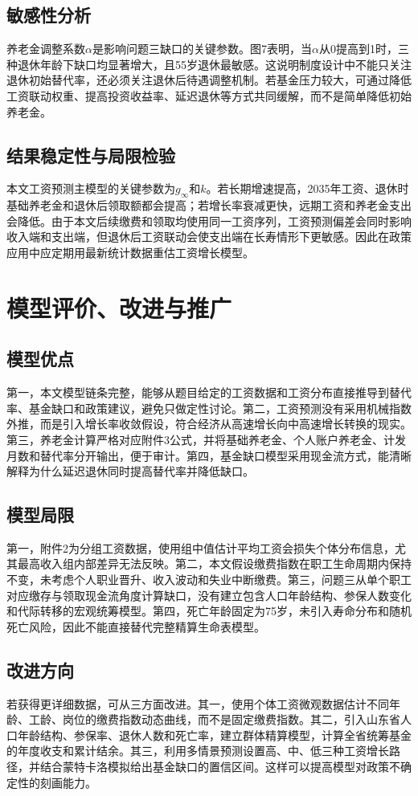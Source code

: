 \documentclass[UTF8,12pt,a4paper]{ctexart}
\begin{document}
\subsection{敏感性分析}
养老金调整系数$\alpha$是影响问题三缺口的关键参数。图7表明，当$\alpha$从0提高到1时，三种退休年龄下缺口均显著增大，且55岁退休最敏感。这说明制度设计中不能只关注退休初始替代率，还必须关注退休后待遇调整机制。若基金压力较大，可通过降低工资联动权重、提高投资收益率、延迟退休等方式共同缓解，而不是简单降低初始养老金。

\subsection{结果稳定性与局限检验}
本文工资预测主模型的关键参数为$g_\infty$和$k$。若长期增速提高，2035年工资、退休时基础养老金和退休后领取额都会提高；若增长率衰减更快，远期工资和养老金支出会降低。由于本文后续缴费和领取均使用同一工资序列，工资预测偏差会同时影响收入端和支出端，但退休后工资联动会使支出端在长寿情形下更敏感。因此在政策应用中应定期用最新统计数据重估工资增长模型。

\section{模型评价、改进与推广}
\subsection{模型优点}
第一，本文模型链条完整，能够从题目给定的工资数据和工资分布直接推导到替代率、基金缺口和政策建议，避免只做定性讨论。第二，工资预测没有采用机械指数外推，而是引入增长率收敛假设，符合经济从高速增长向中高速增长转换的现实。第三，养老金计算严格对应附件3公式，并将基础养老金、个人账户养老金、计发月数和替代率分开输出，便于审计。第四，基金缺口模型采用现金流方式，能清晰解释为什么延迟退休同时提高替代率并降低缺口。

\subsection{模型局限}
第一，附件2为分组工资数据，使用组中值估计平均工资会损失个体分布信息，尤其最高收入组内部差异无法反映。第二，本文假设缴费指数在职工生命周期内保持不变，未考虑个人职业晋升、收入波动和失业中断缴费。第三，问题三从单个职工对应缴存与领取现金流角度计算缺口，没有建立包含人口年龄结构、参保人数变化和代际转移的宏观统筹模型。第四，死亡年龄固定为75岁，未引入寿命分布和随机死亡风险，因此不能直接替代完整精算生命表模型。

\subsection{改进方向}
若获得更详细数据，可从三方面改进。其一，使用个体工资微观数据估计不同年龄、工龄、岗位的缴费指数动态曲线，而不是固定缴费指数。其二，引入山东省人口年龄结构、参保率、退休人数和死亡率，建立群体精算模型，计算全省统筹基金的年度收支和累计结余。其三，利用多情景预测设置高、中、低三种工资增长路径，并结合蒙特卡洛模拟给出基金缺口的置信区间。这样可以提高模型对政策不确定性的刻画能力。
\end{document}
